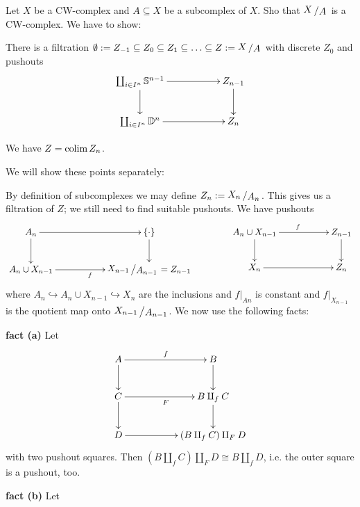 \documentclass[11pt]{book}
\numberwithin{dummy}{section}
\theoremstyle{nonumberbreak}
\newenvironment{sol}[1][]{\ifthenelse{\equal{#1}{}}{\solution}{\solution[#1]}\rm}{\endsolution}
\newenvironment{prob}[1][]{\ifthenelse{\equal{#1}{}}{\problem}{\problem[#1]}\rm}{\endproblem}
\newcommand{\Sph}{\mathbb{S}}
\newcommand{\slant}[2]{{\raisebox{.1em}{$#1$}\left/\raisebox{-.1em}{$#2$}\right.}}
\begin{document}
\begin{spacing}{1.4}
\begin{prob}%
Let $X$ be a CW-complex and $A\subseteq X$ be a subcomplex of $X$. Sho that $\slant{X}{A}$ is a CW-complex.
\begin{sol}
We have to show:
\begin{compactenum}
\item There is a filtration $\emptyset := Z_{-1} \subseteq Z_0 \subseteq Z_1 \subseteq \ldots \subseteq Z := \slant{X}{A}$ with discrete $Z_0$ and pushouts
$$
\begin{xy}
\xymatrix{
\coprod_{i \in I^n} \Sph^{n-1} \ar[rr] \ar[d] && Z_{n-1} \ar[d] \\ \coprod_{i\in I^n} \mathbb{D}^n \ar[rr] && Z_n 
}
\end{xy}
$$
\item We have $Z= \mathrm{colim} \hspace{1.5pt} Z_n$.
\end{compactenum}
We will show these points separately:
\begin{compactenum}
\item By definition of subcomplexes we may define $Z_n:= \slant{X_n}{A_n}$. This gives us a filtration of $Z$; we still need to find suitable pushouts. We have pushouts
$$
\begin{xy}
\xymatrix{
A_n \ar[rr] \ar[d] &&\{\cdot\} \ar[d] \\ A_n \cup X_{n-1} \ar[rr]_{f} && \slant{X_{n-1}}{A_{n-1}}=Z_{n-1}
}
\end{xy}
\qquad  \qquad 
\begin{xy}
\xymatrix{
A_n \cup X_{n-1} \ar[rr]^{f} \ar[d] && Z_{n-1} \ar[d] \\ X_n \ar[rr] && Z_n
}
\end{xy}
$$
where $A_n \hookrightarrow A_n \cup X_{n-1} \hookrightarrow X_n$ are the inclusions and $f\vert_{An}$ is constant and $f\vert_{X_{n-1}}$ is the quotient map onto $\slant{X_{n-1}}{A_{n-1}}$. We now use the following facts:
\begin{compactenum}
\item[\textbf{fact (a)}] Let 
$$
\begin{xy}
\xymatrix{
A \ar[rr]^f \ar[d] && B \ar[d] \\ C \ar[rr]_{F} \ar[d] && B \amalg_f C \ar[d] \\ D \ar[rr] && (B \amalg_f C) \amalg_F D
}
\end{xy}
$$
with two pushout squares. Then $(B \amalg_f C ) \amalg_F D \cong B \amalg_f D$, i.e. the outer square is a pushout, too.
\item[\textbf{fact (b)}] Let 

\end{compactenum}
\end{compactenum}
\end{sol}
\end{prob}
\end{spacing}
\end{document}
